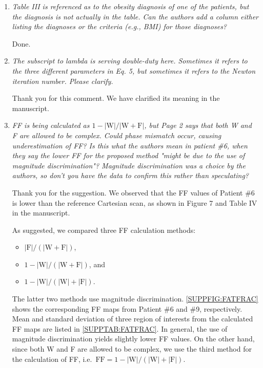 \documentclass[a4paper,11pt]{report}
\begin{document}
\begin{enumerate}[resume]
	\item \textit{Table III is referenced as to the obesity diagnosis of one of the patients, but the diagnosis is not actually in the table. Can the authors add a column either listing the diagnoses or the criteria (e.g., BMI) for those diagnoses?}

\hspace{1em} Done.

	\item \textit{The subscript to lambda is serving double-duty here. Sometimes it refers to the three different parameters in Eq. 5, but sometimes it refers to the Newton iteration number. Please clarify.}

\hspace{1em} Thank you for this comment. We have clarified its meaning in the manuscript.

	\item \textit{FF is being calculated as $1 - |\text{W}|/|\text{W}+\text{F}|$, but Page 2 says that both W and F are allowed to be complex. Could phase mismatch occur, causing underestimation of FF?  Is this what the authors mean in patient \#6, when they say the lower FF for the proposed method "might be due to the use of magnitude discrimination"? Magnitude discrimination was a choice by the authors, so don't you have the data to confirm this rather than speculating?}

\hspace{1em} Thank you for the suggestion. We observed that the FF values of 
Patient \#6 is lower than the reference Cartesian scan, 
as shown in Figure 7 and Table IV in the manuscript.

\hspace{1em} As suggested, we compared three FF calculation methods: 
\begin{itemize}
	\item $|\mathrm{F}|/(|\mathrm{W} + \mathrm{F}|)$, 
	\item $1 - |\mathrm{W}|/(|\mathrm{W} + \mathrm{F}|)$, and 
	\item $1 - |\mathrm{W}|/(|\mathrm{W}| + |\mathrm{F}|)$. 
\end{itemize}
The latter two methods use magnitude discrimination.
\cref{SUPPFIG:FATFRAC} shows the corresponding FF maps from Patient \#6 and \#9, respectively.
Mean and standard deviation of three region of interests from the calculated FF maps are listed 
in \cref{SUPPTAB:FATFRAC}. 
In general, the use of magnitude discrimination yields slightly lower FF values. 
On the other hand, since both W and F are allowed to be complex, 
we use the third method for the calculation of FF, 
i.e.~$\mathrm{FF} = 1 - |\mathrm{W}| / (|\mathrm{W}| + |\mathrm{F}|)$.


\end{enumerate}
\end{document}
